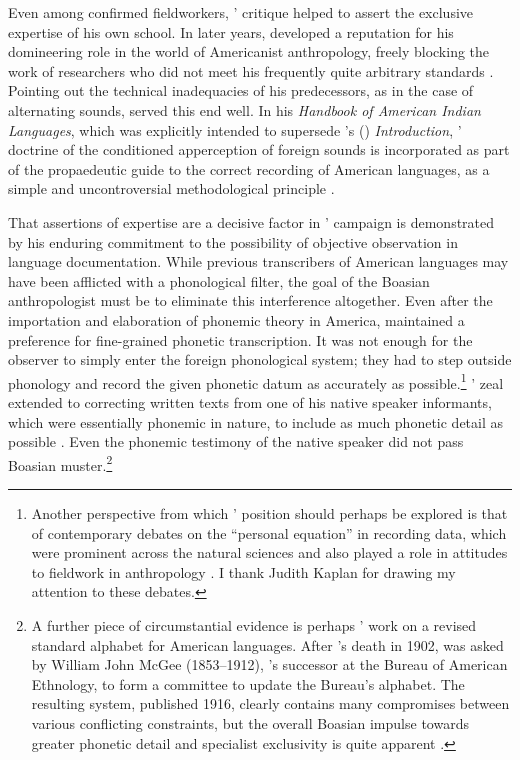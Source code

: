 \documentclass[output=paper]{langscibook}
\begin{document}
Even among confirmed fieldworkers, {\Boas}' critique helped to assert the exclusive expertise of his own school. In later years, {\Boas} developed a reputation for his domineering role in the world of Americanist anthropology,\label{q:mcelvenny:domineering} freely blocking the work of researchers who did not meet his frequently quite arbitrary standards \citep[see][]{Darnell1998}. Pointing out the technical inadequacies of his predecessors, as in the case of alternating sounds, served this end well. In his \citeyear{Boas1911} \emph{Handbook of American Indian Languages}, which was explicitly intended to supersede {\Powell}'s (\citeyear{Powell18801877}) \emph{Introduction}, {\Boas}' doctrine of the conditioned apperception of foreign sounds is incorporated as part of the propaedeutic guide to the correct recording of American languages, as a simple and uncontroversial methodological principle \citep[see][16--18]{Boas1911}.

That assertions of expertise are a decisive factor in {\Boas}' campaign is demonstrated by his enduring commitment to the possibility of objective observation in language documentation. While previous transcribers of American languages may have been afflicted with a phonological filter, the goal of the Boasian anthropologist must be to eliminate this interference altogether. Even after the importation and elaboration of phonemic theory in America, {\Boas} maintained a preference for fine-grained phonetic transcription. It was not enough for the observer to simply enter the foreign phonological system; they had to step outside phonology and record the given phonetic datum as accurately as possible.\footnote{Another perspective from which {\Boas}' position should perhaps be explored is that of contemporary debates on the ``personal equation'' in recording data, which were prominent across the natural sciences \citep[see][]{Schaffer1988} and also played a role in attitudes to fieldwork in anthropology \citep[see][]{Kuklick2011}. I thank Judith Kaplan for drawing my attention to these debates.} {\Boas}' zeal extended to correcting written texts from one of his native speaker informants, which were essentially phonemic in nature, to include as much phonetic detail as possible \citep[see][204--208]{Anderson1985}. Even the phonemic testimony of the native speaker did not pass Boasian muster.\footnote{A further piece of circumstantial evidence is perhaps {\Boas}' work on a revised standard alphabet for American languages. After {\Powell}'s death in 1902, {\Boas} was asked by William John McGee (1853--1912), {\Powell}'s successor at the Bureau of American Ethnology, to form a committee to update the Bureau's alphabet. The resulting system, published 1916, clearly contains many compromises between various conflicting constraints, but the overall Boasian impulse towards greater phonetic detail and specialist exclusivity is quite apparent \citep[see][195--197]{Darnell1998}.}
\end{document}

